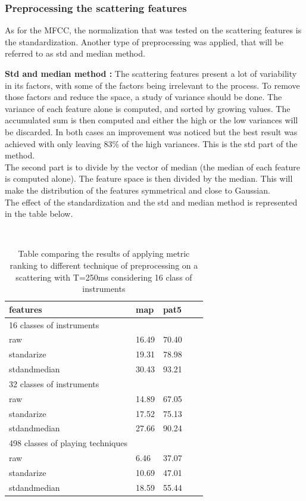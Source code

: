 \documentclass[hidelinks,12pt]{report}
\begin{document}
\subsubsection{Preprocessing the scattering features}
As for the MFCC, the normalization that was tested on the scattering features is the standardization. Another type of preprocessing was applied, that will be referred to as std and median method.\par
\textbf{Std and median method :} The scattering features present a lot of variability in its factors, with some of the factors being irrelevant to the process. To remove those factors and reduce the space, a study of variance should be done. The variance of each feature alone is computed, and sorted by growing values. The accumulated sum is then computed and either the high or the low variances will be discarded. In both cases an improvement was noticed but the best result was achieved with only leaving 83\% of the high variances. This is the std part of the method. \\
The second part is to divide by the vector of median (the median of each feature is computed alone). The feature space is then divided by the median. This will make the distribution of the features symmetrical and close to Gaussian.\\
The effect of the standardization and the std and median method is represented in the table below.

\begin{table} [H]
\begin{center} 
\ 
 \setlength{\tabcolsep}{.16667em} 
\begin{tabular}{ | l | l | l | l | l |}
features & map & pat5  \\ 
\hline 
16 classes of instruments\\
\hline

raw & 16.49 & 70.40  \\ 
standarize & 19.31 & 78.98 \\ 
stdandmedian & 30.43 & 93.21 \\ \hline
 32 classes of instruments \\ 
 \hline
 

 raw & 14.89 & 67.05 \\ 
standarize & 17.52 & 75.13  \\ 
stdandmedian & 27.66 & 90.24  \\ 
\hline
 498 classes of playing techniques \\
 \hline

raw &  6.46 & 37.07  \\ 
standarize & 10.69 & 47.01  \\ 
stdandmedian & 18.59 & 55.44  \\ 
\end{tabular} 
\end{center} 
\caption{Table comparing the results of applying metric ranking to different technique of preprocessing on a scattering with T=250ms considering 16 class of instruments} 
\label{you} 
\end{table}
\end{document}

